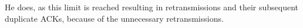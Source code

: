 He does, as this limit is reached resulting in retransmissions and their subsequent duplicate ACKs, because of the unnecessary retransmissions.